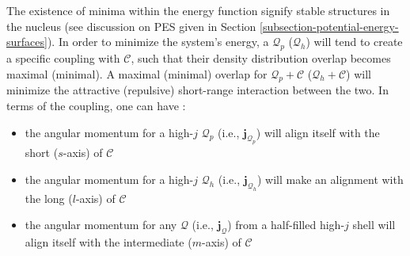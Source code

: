 The existence of minima within the energy function signify stable structures in the nucleus (see discussion on PES given in Section \ref{subsection-potential-energy-surfaces}). In order to minimize the system's energy, a $\mathcal{Q}_p$ ($\mathcal{Q}_h$) will tend to create a specific coupling with $\mathscr{C}$, such that their density distribution overlap becomes maximal (minimal). A maximal (minimal) overlap for $\mathcal{Q}_p+\mathscr{C}$ ($\mathcal{Q}_h+\mathscr{C}$) will minimize the attractive (repulsive) short-range interaction between the two. In terms of the coupling, one can have \cite{frauendorf2014transverse}:
\begin{itemize}
    \item the angular momentum for a high-$j$ $\mathcal{Q}_p$ (i.e., $\mathbf{j}_{\mathcal{Q}_p}$) will align itself with the short ($s$-axis) of $\mathscr{C}$ 
    \item the angular momentum for a high-$j$ $\mathcal{Q}_h$ (i.e., $\mathbf{j}_{\mathcal{Q}_h}$) will make an alignment with the long ($l$-axis) of $\mathscr{C}$
    \item the angular momentum for any $\mathcal{Q}$ (i.e., $\mathbf{j}_{\mathcal{Q}}$) from a half-filled high-$j$ shell will align itself with the intermediate ($m$-axis) of $\mathscr{C}$
\end{itemize}

